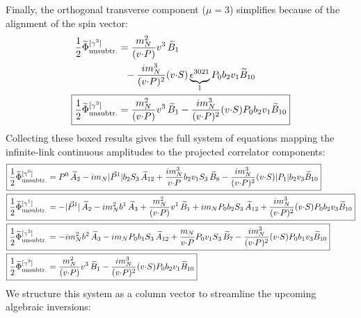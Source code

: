 Finally, the orthogonal transverse component ($\mu=3$) simplifies because of the alignment of the spin vector:
\begin{align}
    \frac{1}{2}\widetilde \Phi^{[\gamma^3]}_{\unsub} & = \frac{\mN^2}{(v \tcdot P)} v^3\, \tBmp_1 
		\nonumber \\ &
		~~
		- \frac{i \mN^3}{(v \tcdot P)^2} (v \tcdot S) \underbrace{\epsilon^{3 0 2 1}}_{1} P_0 \bvec_2 v_1 \tBmp_{10}\\
  \Aboxed{\frac{1}{2}\widetilde \Phi^{[\gamma^3]}_{\unsub}& = \frac{\mN^2}{(v \tcdot P)} v^3\, \tBmp_1- \frac{i \mN^3}{(v \tcdot P)^2} (v \tcdot S)  P_0 \bvec_2 v_1 \tBmp_{10}}
\end{align}
Collecting these boxed results gives the full system of equations mapping the infinite-link continuous amplitudes to the projected correlator components:
\begingroup\small
\begin{align}
   \Aboxed{ \frac{1}{2}\widetilde \Phi^{[\gamma^{0}]}_{\unsub}& = P^0\, \tAmp_2  - i \mN  |\vec{P}^1| \bvec_2 S_3\, \tAmp_{12}+ \frac{ i \mN^3}{v \tcdot P}  \bvec_2 v_1 S_3\, \tBmp_8- \frac{i \mN^3}{(v \tcdot P)^2} (v \tcdot S)  |P_1| \bvec_2 v_3 \tBmp_{10}}\\
   \Aboxed{ \frac{1}{2}\widetilde \Phi^{[\gamma^{1}]}_{\unsub} & =-|\vec{P}^1|\, \tAmp_2- i \mN^2 \bvec^1\, \tAmp_3+ \frac{\mN^2}{(v \tcdot P)} v^1\, \tBmp_1 
		+ i \mN  P_0 \bvec_2 S_3\, \tAmp_{12}+ \frac{i \mN^3}{(v \tcdot P)^2} (v \tcdot S)  P_0 \bvec_2 v_3 \tBmp_{10}}\\
   \Aboxed{\frac{1}{2}\widetilde \Phi^{[\gamma^2]}_{\unsub} & =- i \mN^2 \bvec^2\, \tAmp_3
		- i \mN  P_0 \bvec_1 S_3\, \tAmp_{12}+ \frac{\mN}{v \tcdot P}  P_0 v_1 S_3\, \tBmp_7- \frac{i \mN^3}{(v \tcdot P)^2} (v \tcdot S) P_0 \bvec_1 v_3 \tBmp_{10}}\\
    \Aboxed{\frac{1}{2}\widetilde \Phi^{[\gamma^3]}_{\unsub}& = \frac{\mN^2}{(v \tcdot P)} v^3\, \tBmp_1- \frac{i \mN^3}{(v \tcdot P)^2} (v \tcdot S)  P_0 \bvec_2 v_1 \tBmp_{10}}
\end{align}
\endgroup
We structure this system as a column vector to streamline the upcoming algebraic inversions:
\begingroup\small

